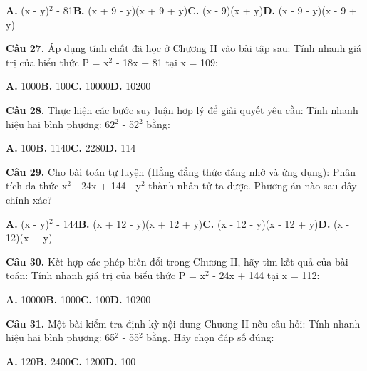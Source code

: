 \documentclass[11pt,a4paper]{article}
\begin{document}
\hspace*{1.5em}\textbf{A.} (x - y)$^2$ - 81\quad\quad \textbf{B.} (x + 9 - y)(x + 9 + y)\quad\quad \textbf{C.} (x - 9)(x + y)\quad\quad \textbf{D.} (x - 9 - y)(x - 9 + y)\par\vspace{2pt}
\textbf{\color{primary} Câu 27.} Áp dụng tính chất đã học ở Chương II vào bài tập sau: Tính nhanh giá trị của biểu thức P = x$^2$ - 18x + 81 tại x = 109:\par
\hspace*{1.5em}\textbf{A.} 1000\quad\quad \textbf{B.} 100\quad\quad \textbf{C.} 10000\quad\quad \textbf{D.} 10200\par\vspace{2pt}
\textbf{\color{primary} Câu 28.} Thực hiện các bước suy luận hợp lý để giải quyết yêu cầu: Tính nhanh hiệu hai bình phương: 62$^2$ - 52$^2$ bằng:\par
\hspace*{1.5em}\textbf{A.} 100\quad\quad \textbf{B.} 1140\quad\quad \textbf{C.} 2280\quad\quad \textbf{D.} 114\par\vspace{2pt}
\textbf{\color{primary} Câu 29.} Cho bài toán tự luyện (Hằng đẳng thức đáng nhớ và ứng dụng): Phân tích đa thức x$^2$ - 24x + 144 - y$^2$ thành nhân tử ta được. Phương án nào sau đây chính xác?\par
\hspace*{1.5em}\textbf{A.} (x - y)$^2$ - 144\quad\quad \textbf{B.} (x + 12 - y)(x + 12 + y)\quad\quad \textbf{C.} (x - 12 - y)(x - 12 + y)\quad\quad \textbf{D.} (x - 12)(x + y)\par\vspace{2pt}
\textbf{\color{primary} Câu 30.} Kết hợp các phép biến đổi trong Chương II, hãy tìm kết quả của bài toán: Tính nhanh giá trị của biểu thức P = x$^2$ - 24x + 144 tại x = 112:\par
\hspace*{1.5em}\textbf{A.} 10000\quad\quad \textbf{B.} 1000\quad\quad \textbf{C.} 100\quad\quad \textbf{D.} 10200\par\vspace{2pt}
\textbf{\color{primary} Câu 31.} Một bài kiểm tra định kỳ nội dung Chương II nêu câu hỏi: Tính nhanh hiệu hai bình phương: 65$^2$ - 55$^2$ bằng. Hãy chọn đáp số đúng:\par
\hspace*{1.5em}\textbf{A.} 120\quad\quad \textbf{B.} 2400\quad\quad \textbf{C.} 1200\quad\quad \textbf{D.} 100\par\vspace{2pt}
\end{document}

